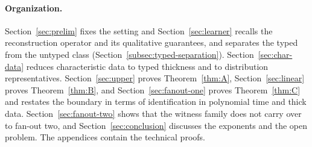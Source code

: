 \paragraph{Organization.}
Section~\ref{sec:prelim} fixes the setting and Section~\ref{sec:learner}
recalls the reconstruction operator and its qualitative guarantees, and
separates the typed from the untyped class (Section~\ref{subsec:typed-separation}).
Section~\ref{sec:char-data} reduces characteristic data to typed thickness and
to distribution representatives.  Section~\ref{sec:upper} proves
Theorem~\ref{thm:A}, Section~\ref{sec:linear} proves Theorem~\ref{thm:B}, and
Section~\ref{sec:fanout-one} proves Theorem~\ref{thm:C} and restates the
boundary in terms of identification in polynomial time and thick data.
Section~\ref{sec:fanout-two} shows that the witness family does not carry over
to fan-out two, and Section~\ref{sec:conclusion} discusses the exponents and the
open problem.  The appendices contain the technical proofs.


